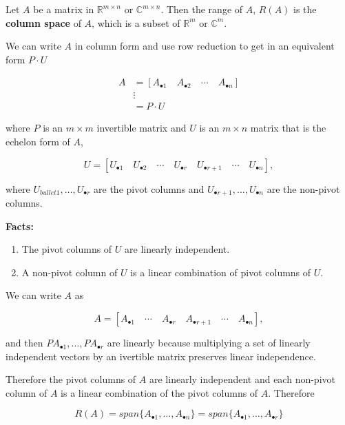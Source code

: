\documentclass[12pt]{article}
\theoremstyle{definition}
\begin{document}
Let $A$ be a matrix in $\mathbb{R}^{m \times n}$ or $\mathbb{C}^{m \times n}$. Then
the range of $A$, $R(A)$ is the \textbf{column space} of $A$, which is a subset of
$\mathbb{R}^m$ or $\mathbb{C}^m$.

We can write $A$ in column form and use row reduction to get in an equivalent form
$P \cdot U$

\begin{align*}
A &= [A_{\bullet 1} \quad A_{\bullet 2} \quad \cdots \quad A_{\bullet n} ] \\
&\vdots \\
&= P \cdot U
\end{align*} 

where $P$ is an $m \times m$ invertible matrix and $U$ is an $m \times n$ matrix
that is the echelon form of $A$,

\[ U = [U_{\bullet 1} \quad U_{\bullet 2} \quad \cdots \quad U_{\bullet r} \quad
U_{\bullet r+1} \quad \cdots \quad U_{\bullet n} ], \]

where $U_{bullet 1}, \ldots, U_{\bullet r}$ are the pivot columns and
$U_{\bullet r+1}, \ldots, U_{\bullet n}$ are the non-pivot columns.

\vspace{0.2cm}

\textbf{Facts:}

\begin{enumerate}[label = (\arabic*)]
\item The pivot columns of $U$ are linearly independent.
\item A non-pivot column of $U$ is a linear combination of pivot columns of $U$.
\end{enumerate}

\vspace{0.2cm}

We can write $A$ as

\[ A = [A_{\bullet 1} \quad \cdots \quad A_{\bullet r} \quad
A_{\bullet r+1} \quad \cdots \quad A_{\bullet n} ], \]

and then $PA_{\bullet 1}, \ldots, PA_{\bullet r}$ are linearly because multiplying
a set of linearly independent vectors by an ivertible matrix preserves linear
independence.

Therefore the pivot columns of $A$ are linearly independent and each non-pivot column
of $A$ is a linear combination of the pivot columns of $A$. Therefore

\[ R(A) = span\{A_{\bullet 1}, \ldots, A_{\bullet n}\} = span\{A_{\bullet 1}, \ldots, A_{\bullet r} \} \]
\end{document}
